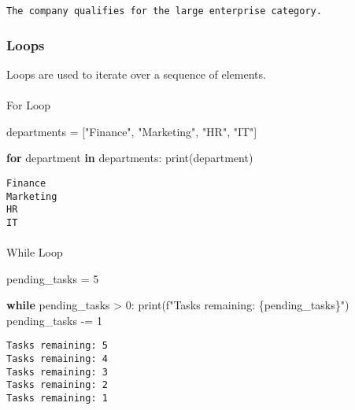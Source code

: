 \documentclass[
  letterpaper,
  DIV=11,
  numbers=noendperiod]{scrreprt}
\makeatletter
\let\oldparagraph\paragraph
\renewcommand{\paragraph}{
    \@ifstar
      \xxxParagraphStar
      \xxxParagraphNoStar
  }
\newcommand{\xxxParagraphStar}[1]{\oldparagraph*{#1}\mbox{}}
\newcommand{\xxxParagraphNoStar}[1]{\oldparagraph{#1}\mbox{}}
\newenvironment{Shaded}{\begin{snugshade}}{\end{snugshade}}
\newcommand{\BuiltInTok}[1]{\textcolor[rgb]{0.00,0.23,0.31}{#1}}
\newcommand{\ControlFlowTok}[1]{\textcolor[rgb]{0.00,0.23,0.31}{\textbf{#1}}}
\newcommand{\DecValTok}[1]{\textcolor[rgb]{0.68,0.00,0.00}{#1}}
\newcommand{\KeywordTok}[1]{\textcolor[rgb]{0.00,0.23,0.31}{\textbf{#1}}}
\newcommand{\NormalTok}[1]{\textcolor[rgb]{0.00,0.23,0.31}{#1}}
\newcommand{\OperatorTok}[1]{\textcolor[rgb]{0.37,0.37,0.37}{#1}}
\newcommand{\SpecialCharTok}[1]{\textcolor[rgb]{0.37,0.37,0.37}{#1}}
\newcommand{\SpecialStringTok}[1]{\textcolor[rgb]{0.13,0.47,0.30}{#1}}
\newcommand{\StringTok}[1]{\textcolor[rgb]{0.13,0.47,0.30}{#1}}
\makeatother
\begin{document}
\begin{verbatim}
The company qualifies for the large enterprise category.
\end{verbatim}

\subsubsection{Loops}\label{loops}

Loops are used to iterate over a sequence of elements.

\paragraph{For Loop}\label{for-loop}

\begin{Shaded}
\begin{Highlighting}[]
\NormalTok{departments }\OperatorTok{=}\NormalTok{ [}\StringTok{"Finance"}\NormalTok{, }\StringTok{"Marketing"}\NormalTok{, }\StringTok{"HR"}\NormalTok{, }\StringTok{"IT"}\NormalTok{]}

\ControlFlowTok{for}\NormalTok{ department }\KeywordTok{in}\NormalTok{ departments:}
    \BuiltInTok{print}\NormalTok{(department)}
\end{Highlighting}
\end{Shaded}

\begin{verbatim}
Finance
Marketing
HR
IT
\end{verbatim}

\paragraph{While Loop}\label{while-loop}

\begin{Shaded}
\begin{Highlighting}[]
\NormalTok{pending\_tasks }\OperatorTok{=} \DecValTok{5}

\ControlFlowTok{while}\NormalTok{ pending\_tasks }\OperatorTok{\textgreater{}} \DecValTok{0}\NormalTok{:}
    \BuiltInTok{print}\NormalTok{(}\SpecialStringTok{f"Tasks remaining: }\SpecialCharTok{\{}\NormalTok{pending\_tasks}\SpecialCharTok{\}}\SpecialStringTok{"}\NormalTok{)}
\NormalTok{    pending\_tasks }\OperatorTok{{-}=} \DecValTok{1}
\end{Highlighting}
\end{Shaded}

\begin{verbatim}
Tasks remaining: 5
Tasks remaining: 4
Tasks remaining: 3
Tasks remaining: 2
Tasks remaining: 1
\end{verbatim}
\end{document}

